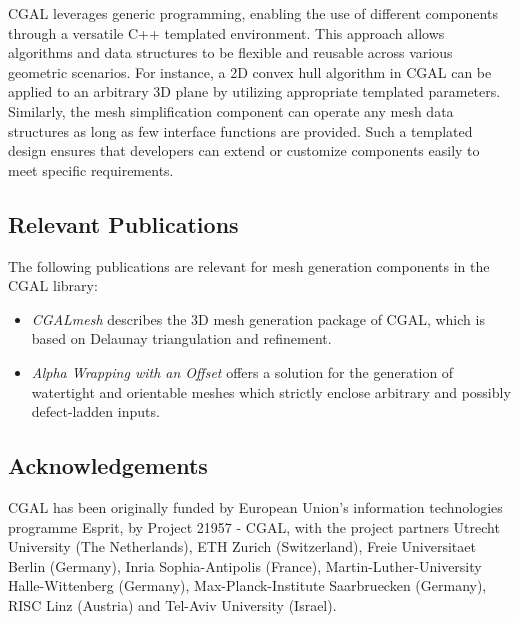 CGAL leverages generic programming, enabling the use of different components through a versatile C++ templated environment.
This approach allows algorithms and data structures to be flexible and reusable across various geometric scenarios.
For instance, a 2D convex hull algorithm in CGAL can be applied to an arbitrary 3D plane by utilizing appropriate templated parameters. Similarly, the mesh simplification component can operate any mesh data structures as long as few interface functions are provided.
Such a templated design ensures that developers can extend or customize components easily to meet specific requirements.


\subsection{Relevant Publications}
\label{sec:CGAL:publications}

The following publications are relevant for mesh generation components in the CGAL library:

\begin{itemize}
\item \textit{CGALmesh} \cite{jamin_cgalmesh_2015} describes the 3D mesh generation package of CGAL, which is based on Delaunay triangulation and refinement.
\item \textit{Alpha Wrapping with an Offset} \cite{portaneri_alpha_2022} offers a solution for the generation of watertight and orientable meshes which strictly enclose arbitrary and possibly defect-ladden inputs.
\end{itemize}


\subsection{Acknowledgements}
\label{sec::CGAL:acknowledgements}

%
%



CGAL has been originally funded by European Union's information technologies programme Esprit, by Project 21957 - CGAL, with the project partners Utrecht University (The Netherlands), ETH Zurich (Switzerland), Freie Universitaet Berlin (Germany), Inria Sophia-Antipolis (France), Martin-Luther-University Halle-Wittenberg (Germany), Max-Planck-Institute Saarbruecken (Germany), RISC Linz (Austria) and Tel-Aviv University (Israel).

